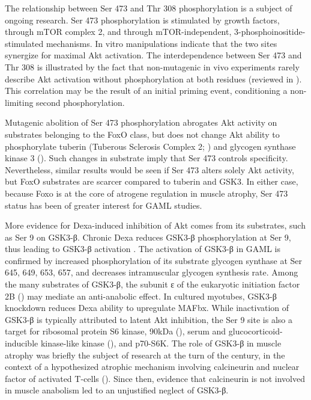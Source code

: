 \documentclass[12pt,english]{report}\usepackage[]{graphicx}\usepackage[]{color}
\begin{document}
The relationship between Ser 473 and Thr 308 phosphorylation is a
subject of ongoing research. Ser 473 phosphorylation is stimulated
by growth factors, through mTOR complex 2, and through mTOR-independent,
3-phosphoinositide-stimulated mechanisms\citep{sarbassov2005phosphorylation}.
In vitro manipulations indicate that the two sites synergize for maximal
Akt activation\citep{alessi1996mechanism}. The interdependence between
Ser 473 and Thr 308 is illustrated by the fact that non-mutagenic
in vivo experiments rarely describe Akt activation without phosphorylation
at both residues (reviewed in \citep{manning2007akt/pkb}). This correlation
may be the result of an initial priming event, conditioning a non-limiting
second phosphorylation.

Mutagenic abolition of Ser 473 phosphorylation abrogates Akt activity
on substrates belonging to the FoxO class, but does not change Akt
ability to phosphorylate tuberin (Tuberous Sclerosis Complex 2; )
and glycogen synthase kinase 3 ()\citep{jacinto2006sin1/mip1}.
Such changes in substrate imply that Ser 473 controls specificity.
Nevertheless, similar results would be seen if Ser 473 alters solely
Akt activity, but FoxO substrates are scarcer compared to tuberin
and GSK3. In either case, because Foxo is at the core of atrogene
regulation in muscle atrophy, Ser 473 status has been of greater interest
for GAML studies.

More evidence for Dexa-induced inhibition of Akt comes from its substrates,
such as Ser 9 on GSK3-β. Chronic Dexa reduces GSK3-β phosphorylation
at Ser 9, thus leading to GSK3-β activation \citep{buren2008insulin}.
The activation of GSK3-β in GAML is confirmed by increased phosphorylation
of its substrate glycogen synthase at Ser 645, 649, 653, 657, and
decreases intramuscular glycogen synthesis rate\citep{ruzzin2005contraction,coderre2007regulation,buren2008insulin}.
Among the many substrates of GSK3-β, the subunit ε of the eukaryotic
initiation factor 2B ()
may mediate an anti-anabolic effect\citep{welsh1993glycogen}. In
cultured myotubes, GSK3-β knockdown reduces Dexa ability to upregulate
MAFbx\citep{verhees2011glycogen}. While inactivation of GSK3-β is
typically attributed to latent Akt inhibition, the Ser 9 site is also
a target for ribosomal protein S6 kinase, 90kDa (),
serum and glucocorticoid-inducible kinase-like kinase (),
and p70-S6K\citep{zhang2006s6k1,dai2002human,frame2001gsk3}. The
role of GSK3-β in muscle atrophy was briefly the subject of research
at the turn of the century, in the context of a hypothesized atrophic
mechanism involving calcineurin and nuclear factor of activated T-cells
(). Since
then, evidence that calcineurin is not involved in muscle anabolism\citep{sacheck2004igf-i}
led to an unjustified neglect of GSK3-β.
\end{document}
